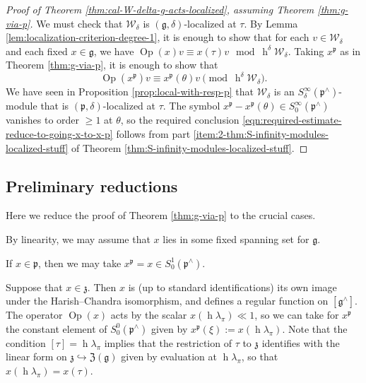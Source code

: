 \documentclass[reqno]{amsart}
\DeclareMathOperator{\h}{h}
\def\O{\operatorname{O}}
\DeclareMathOperator{\Opp}{Op}
\theoremstyle{plain} \newtheorem{theorem} {Theorem}
\theoremstyle{definition} \newtheorem{definition} [theorem] {Definition}
\theoremstyle{itplain} %
\numberwithin{equation}{section}
\numberwithin{theorem}{section}
\renewcommand{\geq}{\geqslant}
\begin{document}
\begin{proof}[Proof of Theorem
  \ref{thm:cal-W-delta-g-acts-localized},
  assuming Theorem \ref{thm:g-via-p}]
  We must check that $\mathcal{W}_\delta$ is $(\mathfrak{g},\delta)$-localized at $\tau$.  By Lemma \ref{lem:localization-criterion-degree-1}, it is enough to show that for each $v \in \mathcal{W}_\delta$ and each fixed $x \in \mathfrak{g}$, we have $\Opp(x) v \equiv x(\tau) v \mod{\h^\delta \mathcal{W}_\delta}$.  Taking $x^\mathfrak{p}$ as in Theorem \ref{thm:g-via-p}, it is enough to show that
  \begin{equation}\label{eqn:required-estimate-reduce-to-going-x-to-x-p}
    \Opp(x^\mathfrak{p}) v
    \equiv x^\mathfrak{p}(\theta) v
    \pmod{\h^\delta \mathcal{W}_\delta}.
  \end{equation}
  We have seen in Proposition \ref{prop:local-with-resp-p} that $\mathcal{W}_\delta$ is an $S^\infty_\delta(\mathfrak{p}^\wedge)$-module that is $(\mathfrak{p},\delta)$-localized at $\tau$.  The symbol $x^\mathfrak{p} - x^\mathfrak{p}(\theta) \in S^\infty_0(\mathfrak{p}^\wedge)$ vanishes to order $\geq 1$ at $\theta$, so the required conclusion \eqref{eqn:required-estimate-reduce-to-going-x-to-x-p} follows from part \eqref{item:2-thm:S-infinity-modules-localized-stuff} of Theorem \ref{thm:S-infinity-modules-localized-stuff}.
\end{proof}


\subsection{Preliminary reductions}
Here we reduce the proof of Theorem \ref{thm:g-via-p} to the crucial cases.

By linearity, we may assume that $x$ lies in some fixed spanning set for $\mathfrak{g}$.
  
If $x \in \mathfrak{p}$, then we may take $x^\mathfrak{p} = x \in S^1_0(\mathfrak{p}^\wedge)$.

Suppose that $x \in \mathfrak{z}$.  Then $x$ is (up to standard identifications) its own image under the Harish--Chandra isomorphism, and defines a regular function on $[\mathfrak{g}^\wedge]$.  The operator $\Opp(x)$ acts by the scalar $x(\h \lambda_\pi) \ll 1$, so we can take for $x^\mathfrak{p}$ the constant element of $S^0_0(\mathfrak{p}^\wedge)$ given by $x^\mathfrak{p}(\xi) := x(\h \lambda_\pi)$.  Note that the condition $[\tau] = \h \lambda_\pi$ implies that the restriction of $\tau$ to $\mathfrak{z}$ identifies with the linear form on $\mathfrak{z} \hookrightarrow \mathfrak{Z}(\mathfrak{g})$ given by evaluation at $\h \lambda_\pi$, so that $x(\h \lambda_\pi) = x(\tau)$.
\end{document}
